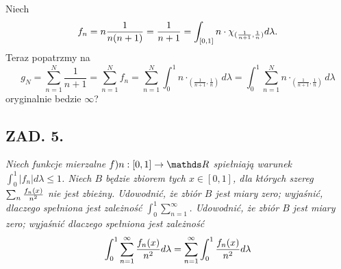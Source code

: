 \documentclass{article}
\begin{document}
Niech 
$$f_n=n{1\over n(n+1)}=\frac1{n+1}=\int_{[0,1]}n\cdot\chi_{(\frac1{n+1},\frac1n)}d\lambda.$$
Teraz popatrzmy na
$$g_N=\sum_{n=1}^N\frac1{n+1}=\sum_{n=1}^Nf_n=\sum_{n=1}^N\int_0^1n\cdot_{(\frac1{n+1},\frac1n)}d\lambda=\int_0^1\sum_{n=1}^Nn\cdot_{(\frac1{n+1},\frac1n)}d\lambda$$
oryginalnie bedzie $\infty$?


\subsection*{ZAD. 5.}
\emph{Niech funkcje mierzalne $f)n:[0,1]\to\R$ spiełniają warunek $\int_0^1|f_n|d\lambda\leq1$. Niech $B$ będzie zbiorem tych $x\in[0,1]$, dla których szereg $\sum_n {f_n(x)\over n^2}$ nie jest zbieżny. Udowodnić, że zbiór $B$ jest miary zero; wyjaśnić, dlaczego spełniona jest zależność $\int_0^1\sum_{n=1}^\infty$. Udowodnić, że zbiór $B$ jest miary zero; wyjaśnić dlaczego spełniona jest zależność}
$$\int_0^1\sum\limits_{n=1}^\infty{f_n(x)\over n^2}d\lambda=\sum\limits_{n=1}^\infty\int_0^1{f_n(x)\over n^2}d\lambda$$
\end{document}
